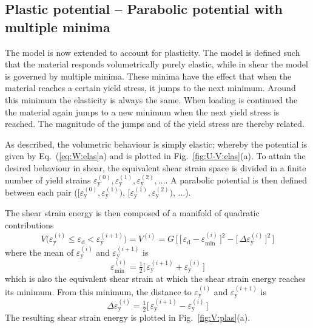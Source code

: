 \documentclass[times,namecite]{goose-article}
\begin{document}
\subsection{Plastic potential -- Parabolic potential with multiple minima}

The model is now extended to account for plasticity. The model is defined such that the material responds volumetrically purely elastic, while in shear the model is governed by multiple minima. These minima have the effect that when the material reaches a certain yield stress, it jumps to the next minimum. Around this minimum the elasticity is always the same. When loading is continued the the material again jumps to a new minimum when the next yield stress is reached. The magnitude of the jumps and of the yield stress are thereby related.

As described, the volumetric behaviour is simply elastic; whereby the potential is given by Eq.~(\ref{eq:W:elas}a) and is plotted in Fig.~\ref{fig:U-V:elas}(a). To attain the desired behaviour in shear, the equivalent shear strain space is divided in a finite number of yield strains $\varepsilon_\mathrm{y}^{(0)}, \varepsilon_\mathrm{y}^{(1)}, \varepsilon_\mathrm{y}^{(2)}, ...$. A parabolic potential is then defined between each pair ($[ \varepsilon_\mathrm{y}^{(0)}, \varepsilon_\mathrm{y}^{(1)} )$, $[ \varepsilon_\mathrm{y}^{(1)}, \varepsilon_\mathrm{y}^{(2)} )$, ...).

The shear strain energy is then composed of a manifold of quadratic contributions
\begin{equation}
    \label{eq:V-plas}
    V \big(
      \varepsilon_\mathrm{y}^{(i)} \leq \varepsilon_\mathrm{d} < \varepsilon_\mathrm{y}^{(i+1)}
    \big)
    =
    V^{(i)}
    =
    G \, \bigg[\,
      \Big[\, \varepsilon_\mathrm{d} - \varepsilon_\mathrm{min}^{(i)} \,\Big]^2
      -
      \Big[\, \Delta \varepsilon_\mathrm{y}^{(i)} \,\Big]^2
    \,\bigg]
\end{equation}
where the mean of $\varepsilon_\mathrm{y}^{(i)}$ and $\varepsilon_\mathrm{y}^{(i+1)}$ is
\begin{equation}
    \varepsilon_\mathrm{min}^{(i)}
    =
    \tfrac{1}{2} \Big[\, \varepsilon_\mathrm{y}^{(i+1)} + \varepsilon_\mathrm{y}^{(i)} \,\Big]
\end{equation}
which is also the equivalent shear strain at which the shear strain energy reaches its minimum. From this minimum, the distance to $\varepsilon_\mathrm{y}^{(i)}$ and $\varepsilon_\mathrm{y}^{(i+1)}$ is
\begin{equation}
    \Delta \varepsilon_\mathrm{y}^{(i)}
    =
    \tfrac{1}{2} \Big[\, \varepsilon_\mathrm{y}^{(i+1)} - \varepsilon_\mathrm{y}^{(i)} \,\Big]
\end{equation}
The resulting shear strain energy is plotted in Fig.~\ref{fig:V:plas}(a).
\end{document}
